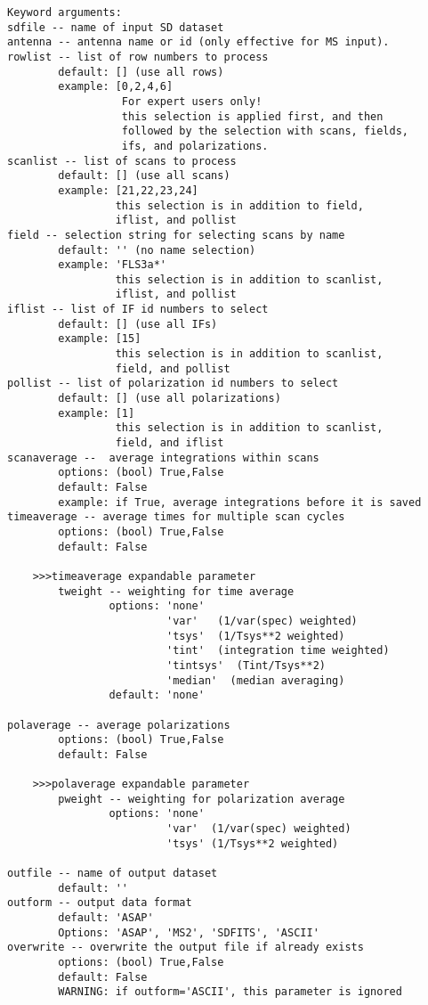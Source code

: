 \begin{verbatim}
Keyword arguments:
sdfile -- name of input SD dataset
antenna -- antenna name or id (only effective for MS input).
rowlist -- list of row numbers to process
        default: [] (use all rows)
        example: [0,2,4,6]
                  For expert users only!
                  this selection is applied first, and then 
                  followed by the selection with scans, fields, 
                  ifs, and polarizations. 
scanlist -- list of scans to process
        default: [] (use all scans)
        example: [21,22,23,24]
                 this selection is in addition to field,
                 iflist, and pollist
field -- selection string for selecting scans by name
        default: '' (no name selection)
        example: 'FLS3a*'
                 this selection is in addition to scanlist,
                 iflist, and pollist
iflist -- list of IF id numbers to select
        default: [] (use all IFs)
        example: [15]
                 this selection is in addition to scanlist,
                 field, and pollist
pollist -- list of polarization id numbers to select
        default: [] (use all polarizations)
        example: [1]
                 this selection is in addition to scanlist,
                 field, and iflist
scanaverage --  average integrations within scans
        options: (bool) True,False
        default: False
        example: if True, average integrations before it is saved
timeaverage -- average times for multiple scan cycles
        options: (bool) True,False
        default: False
    
    >>>timeaverage expandable parameter
        tweight -- weighting for time average
                options: 'none'
                         'var'   (1/var(spec) weighted)
                         'tsys'  (1/Tsys**2 weighted)
                         'tint'  (integration time weighted)
                         'tintsys'  (Tint/Tsys**2)
                         'median'  (median averaging)
                default: 'none'

polaverage -- average polarizations
        options: (bool) True,False
        default: False
       
    >>>polaverage expandable parameter
        pweight -- weighting for polarization average
                options: 'none'
                         'var'  (1/var(spec) weighted)
                         'tsys' (1/Tsys**2 weighted)

outfile -- name of output dataset
        default: ''
outform -- output data format
        default: 'ASAP'
        Options: 'ASAP', 'MS2', 'SDFITS', 'ASCII'
overwrite -- overwrite the output file if already exists
        options: (bool) True,False
        default: False
        WARNING: if outform='ASCII', this parameter is ignored
\end{verbatim}

